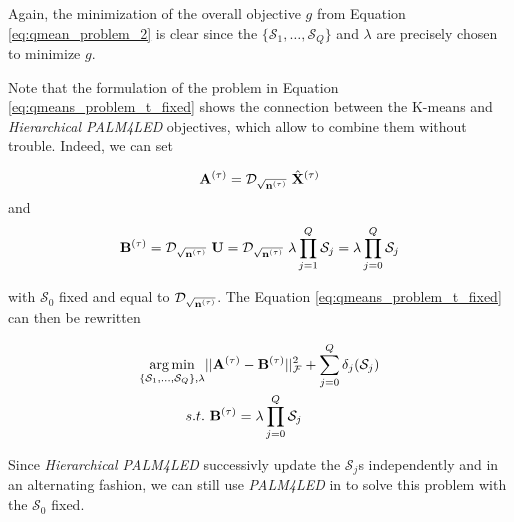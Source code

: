 \documentclass{article}
\begin{document}
Again,  the minimization of the overall objective $g$ from Equation \ref{eq:qmean_problem_2} is clear since the $\{ \mathcal{S}_1, \ldots,\mathcal{S}_Q\}$ and $\lambda$ are precisely chosen to minimize $g$.

Note that the formulation of the problem in Equation \ref{eq:qmeans_problem_t_fixed} shows the connection between the K-means and \textit{Hierarchical PALM4LED} objectives, which allow to combine them without trouble. Indeed, we can set

\begin{equation*}
{\mathbf{A}}^{(\tau)} = \mathcal{D}_{\sqrt{{\mathbf{n}}^{(\tau)}}}~\hat{{\mathbf{X}}}^{(\tau)}
\end{equation*}
and
\begin{equation*}
{\mathbf{B}}^{(\tau)} = \mathcal{D}_{\sqrt{{\mathbf{n}}^{(\tau)}}}~{\mathbf{U}} = \mathcal{D}_{\sqrt{{\mathbf{n}}^{(\tau)}}}~\lambda \prod_{j=1}^{Q}{\mathcal{S}_j} = \lambda \prod_{j=0}^{Q}{\mathcal{S}_j}
\end{equation*}

with $\mathcal{S}_0$ fixed and equal to $\mathcal{D}_{\sqrt{{\mathbf{n}}^{(\tau)}}}$. The Equation \ref{eq:qmeans_problem_t_fixed} can then be rewritten 

\begin{equation}
\begin{split}
 \operatorname*{arg\,min}_{\{ \mathcal{S}_1, \ldots,\mathcal{S}_Q\}, \lambda} & ||{\mathbf{A}}^{(\tau)} - {\mathbf{B}}^{(\tau)}||_{\mathcal{F}} ^ 2  +  \sum_{j=0}^{Q} \delta_j(\mathcal{S}_j)\\
 s.t. &~ {\mathbf{B}}^{(\tau)} = \lambda \prod_{j=0}^{Q}{\mathcal{S}_j}
\end{split}
\end{equation}

Since \textit{Hierarchical PALM4LED} successivly update the $\mathcal{S}_j$s independently and in an alternating fashion, we can still use \textit{PALM4LED} in to solve this problem with the $\mathcal{S}_0$ fixed.
\end{document}
